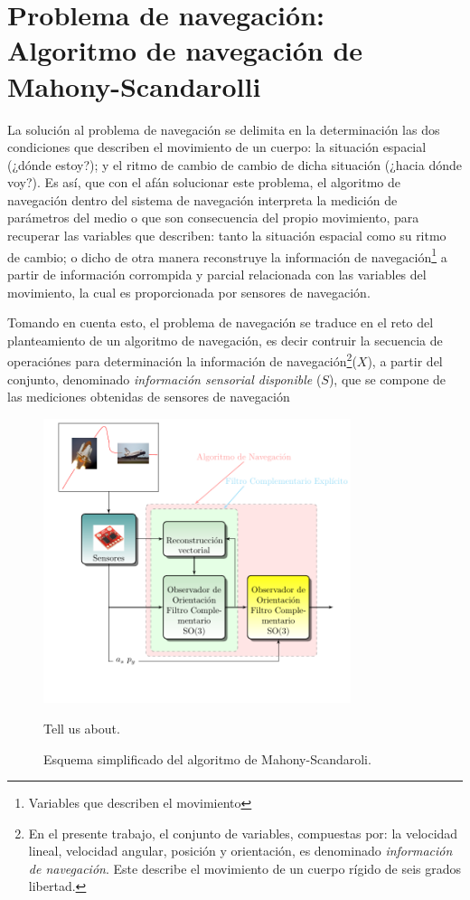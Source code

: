 \documentclass[conference]{IEEEtran}
\begin{document}
\section{Problema de navegación: Algoritmo de navegación de Mahony-Scandarolli}
La solución al problema de navegación se delimita en la determinación  las dos condiciones que describen el movimiento de un cuerpo: la situación espacial (¿dónde estoy?); y el ritmo de cambio de cambio de dicha situación (¿hacia dónde voy?). Es así, que con el afán solucionar este problema, el algoritmo de navegación dentro del sistema de navegación interpreta la medición de parámetros del medio o que son consecuencia del propio movimiento, para recuperar las variables que describen: tanto la situación espacial como su ritmo de cambio; o dicho de otra manera reconstruye la información de navegación\footnote{Variables que describen el movimiento} a partir de información corrompida y parcial relacionada con las variables del movimiento, la cual es proporcionada por sensores de navegación.\par
Tomando en cuenta esto, el problema de navegación se traduce en el reto del planteamiento de un algoritmo de navegación, es decir contruir la secuencia de operaciónes para determinación la información de navegación\footnote{En el presente trabajo, el conjunto de variables, compuestas por: la velocidad lineal, velocidad angular, posición y orientación, es denominado \emph{información de navegación}. Este describe el movimiento de un cuerpo rígido de seis grados libertad.}($X$), a partir del conjunto, denominado \emph{información sensorial disponible} ($S$), que se compone de las mediciones obtenidas de sensores de navegación\par
\begin{figure}
\begin{center}
\includegraphics[width=9cm,clip]{intro_fig4.pdf}
\caption{Esquema simplificado del algoritmo de Mahony-Scandaroli.}
\scriptsize{Tell us about.}
\label{solucionMS_fig1}
\end{center}
\end{figure}
\end{document}
